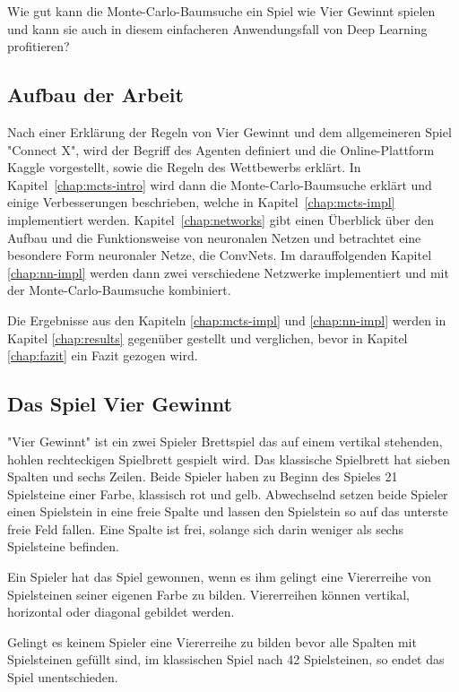 \bigskip
Wie gut kann die Monte-Carlo-Baumsuche ein Spiel wie Vier Gewinnt spielen und kann sie auch in diesem einfacheren Anwendungsfall von Deep Learning profitieren? 

\subsection{Aufbau der Arbeit}
Nach einer Erklärung der Regeln von Vier Gewinnt und dem allgemeineren Spiel "Connect X", wird der Begriff des Agenten definiert und die Online-Plattform Kaggle vorgestellt, sowie die Regeln des Wettbewerbs erklärt. In Kapitel~\ref{chap:mcts-intro} wird dann die Monte-Carlo-Baumsuche erklärt und einige Verbesserungen beschrieben, welche in Kapitel~\ref{chap:mcts-impl} implementiert werden. Kapitel~\ref{chap:networks} gibt einen Überblick über den Aufbau und die Funktionsweise von neuronalen Netzen und betrachtet eine besondere Form neuronaler Netze, die ConvNets. Im darauffolgenden Kapitel \ref{chap:nn-impl} werden dann zwei verschiedene Netzwerke implementiert und mit der Monte-Carlo-Baumsuche kombiniert.

Die Ergebnisse aus den Kapiteln \ref{chap:mcts-impl} und \ref{chap:nn-impl} werden in Kapitel \ref{chap:results} gegenüber gestellt und verglichen, bevor in Kapitel \ref{chap:fazit} ein Fazit gezogen wird.

\subsection{Das Spiel Vier Gewinnt}
"Vier Gewinnt" ist ein zwei Spieler Brettspiel das auf einem vertikal stehenden, hohlen rechteckigen Spielbrett gespielt wird. Das klassische Spielbrett hat sieben Spalten und sechs Zeilen. Beide Spieler haben zu Beginn des Spieles 21 Spielsteine einer Farbe, klassisch rot und gelb. Abwechselnd setzen beide Spieler einen Spielstein in eine freie Spalte und lassen den Spielstein so auf das unterste freie Feld fallen. Eine Spalte ist frei, solange sich darin weniger als sechs Spielsteine befinden.

Ein Spieler hat das Spiel gewonnen, wenn es ihm gelingt eine Viererreihe von Spielsteinen seiner eigenen Farbe zu bilden. Viererreihen können vertikal, horizontal oder diagonal gebildet werden.

Gelingt es keinem Spieler eine Viererreihe zu bilden bevor alle Spalten mit Spielsteinen gefüllt sind, im klassischen Spiel nach 42 Spielsteinen, so endet das Spiel unentschieden.

